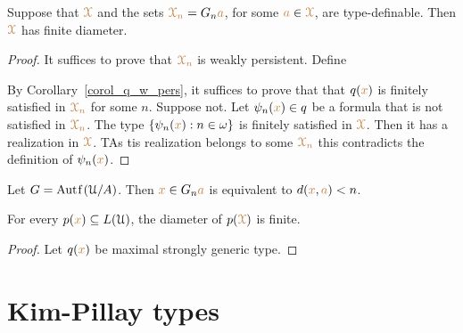 \begin{theorem}
  Suppose that ${\color{brown}\EuScript X}$ and the sets ${\color{brown}\EuScript X_n}=G_n{\color{brown} a}$, for some ${\color{brown} a}\in{\color{brown}\EuScript X}$, are type-definable.
  Then ${\color{brown}\EuScript X}$ has finite diameter.
\end{theorem}

\begin{proof}
  It suffices to prove that ${\color{brown}\EuScript X_n}$ is weakly persistent.
  Define

  
  By Corollary~\ref{corol_q_w_pers}, it suffices to prove that that $q({\color{brown} x})$ is finitely satisfied in $\color{brown}\EuScript X_n$ for some $n$.
  Suppose not. 
  Let $\psi_n({\color{brown} x})\in q$ be a formula that is not satisfied in $\color{brown}\EuScript X_n$.
  The type $\{\psi_n({\color{brown} x}):n\in\omega\}$ is finitely satisfied in ${\color{brown}\EuScript X}$.
  Then it has a realization in ${\color{brown}\EuScript X}$. 
  TAs tis realization belongs to some ${\color{brown}\EuScript X_n}$ this contradicts the definition of $\psi_n({\color{brown} x})$. 
\end{proof}

\begin{example}
  Let $G=\mathord{\rm Aut\kern.15ex{f}\kern.15ex}(\EuScript U/A)$. 
  Then ${\color{brown} x}\in G_n{\color{brown} a}$ is equivalent to $d({\color{brown} x},{\color{brown} a})<n$.
\end{example}

\begin{theorem}
  For every $p({\color{brown} x})\subseteq L(\EuScript U)$, the diameter of $p({\color{brown}\EuScript X})$ is finite.
\end{theorem}

\begin{proof}
  Let $q({\color{brown} x})$ be maximal strongly generic type.
\end{proof}


\section{Kim-Pillay types}\label{KPtypes}


